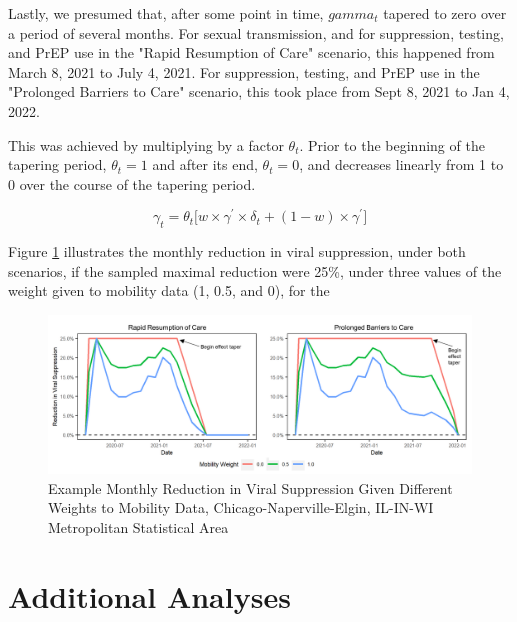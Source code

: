 \documentclass{article}
\begin{document}
Lastly, we presumed that, after some point in time, $gamma_t$ tapered to zero over a period of several months. For sexual transmission, and for suppression, testing, and PrEP use in the "Rapid Resumption of Care" scenario, this happened from March 8, 2021 to July 4, 2021. For suppression, testing, and PrEP use in the "Prolonged Barriers to Care" scenario, this took place from Sept 8, 2021 to Jan 4, 2022. 

This was achieved by multiplying by a factor $\theta_t$. Prior to the beginning of the tapering period, $\theta_t = 1$ and after its end, $\theta_t = 0$, and decreases linearly from 1 to 0 over the course of the tapering period.

\begin{equation*}
\gamma_t = \theta_t \big [w \times \gamma^\prime \times \delta_t + (1-w) \times \gamma^\prime \big]
\end{equation*}

Figure \ref{mobility_eg} illustrates the monthly reduction in viral suppression, under both scenarios, if the sampled maximal reduction were 25\%, under three values of the weight given to mobility data (1, 0.5, and 0), for the 

\begin{figure}[H] 
	\caption{Example Monthly Reduction in Viral Suppression Given Different Weights to Mobility Data, Chicago-Naperville-Elgin, IL-IN-WI Metropolitan Statistical Area}\label{mobility_eg}
	\includegraphics[width=\textwidth]{images/mobility/eg_trends}
\end{figure}

\newpage
\section{Additional Analyses}
\end{document}
